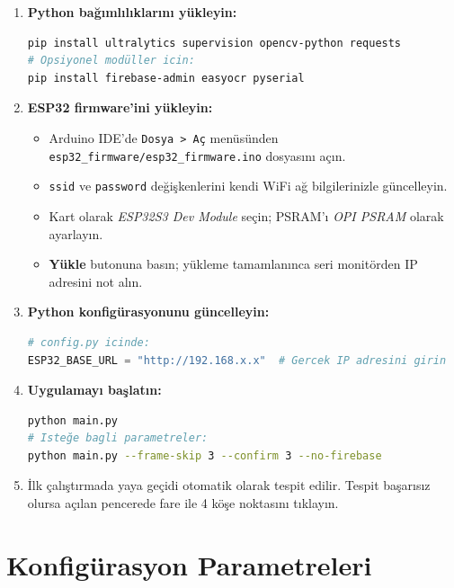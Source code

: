 \begin{enumerate}
  \item \textbf{Python bağımlılıklarını yükleyin:}
\begin{lstlisting}[language=bash, caption={Python bağımlılık kurulumu}]
pip install ultralytics supervision opencv-python requests
# Opsiyonel modüller icin:
pip install firebase-admin easyocr pyserial
\end{lstlisting}

  \item \textbf{ESP32 firmware'ini yükleyin:}
  \begin{itemize}
    \item Arduino IDE'de \texttt{Dosya > Aç} menüsünden \texttt{esp32\_firmware/esp32\_firmware.ino} dosyasını açın.
    \item \texttt{ssid} ve \texttt{password} değişkenlerini kendi WiFi ağ bilgilerinizle güncelleyin.
    \item Kart olarak \textit{ESP32S3 Dev Module} seçin; PSRAM'ı \textit{OPI PSRAM} olarak ayarlayın.
    \item \textbf{Yükle} butonuna basın; yükleme tamamlanınca seri monitörden IP adresini not alın.
  \end{itemize}

  \item \textbf{Python konfigürasyonunu güncelleyin:}
\begin{lstlisting}[language=Python, caption={config.py güncellenmesi}]
# config.py icinde:
ESP32_BASE_URL = "http://192.168.x.x"  # Gercek IP adresini girin
\end{lstlisting}

  \item \textbf{Uygulamayı başlatın:}
\begin{lstlisting}[language=bash, caption={Uygulama başlatma komutu}]
python main.py
# Isteğe bagli parametreler:
python main.py --frame-skip 3 --confirm 3 --no-firebase
\end{lstlisting}

  \item İlk çalıştırmada yaya geçidi otomatik olarak tespit edilir. Tespit başarısız olursa açılan pencerede fare ile 4 köşe noktasını tıklayın.
\end{enumerate}

\section{Konfigürasyon Parametreleri}
\label{ek:konfig}

